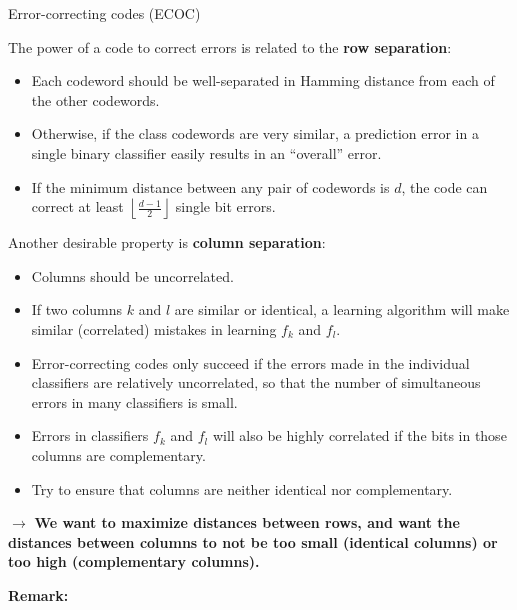 \begin{vbframe}{Error-correcting codes (ECOC)}

The power of a code to correct errors is related to the \textbf{row separation}:

\begin{itemize}
  \item Each codeword should be well-separated in Hamming distance from each of the other codewords. 
  \item Otherwise, if the class codewords are very similar, a prediction error in a single binary classifier easily results in an \enquote{overall} error.
  \item If the minimum distance between any pair of codewords is $d$, the code can correct at least $\left\lfloor \frac{d - 1}{2}\right\rfloor$ single bit errors. 
\end{itemize}

\framebreak

Another desirable property is \textbf{column separation}:

\begin{itemize}
  \item Columns should be uncorrelated.
  \item If two columns $k$ and $l$ are similar or identical, a learning algorithm will make similar (correlated) mistakes in learning $f_k$ and $f_l$.
  \item Error-correcting codes only succeed if the errors made in the individual classifiers are relatively uncorrelated, so that the number of simultaneous errors in many classifiers is small. 
  \item Errors in classifiers $f_k$ and $f_l$ will also be highly correlated if the bits in those columns are complementary. 
  \item Try to ensure that columns are neither identical nor complementary.
\end{itemize}

  $\to$ \textbf{We want to maximize distances between rows, and want the distances between columns to not be too small (identical columns) or too high (complementary columns).} 


\framebreak 

\textbf{Remark:}


\end{vbframe}
